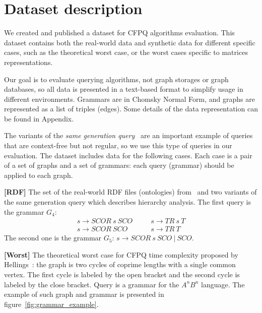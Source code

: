 \section{Dataset description}

We created and published a dataset for CFPQ algorithms evaluation.
This dataset contains both the real-world data and synthetic data for different specific cases, such as the theoretical worst case, or the worst cases specific to matrices representations.

Our goal is to evaluate querying algorithms, not graph storages or graph databases, so all data is presented in a text-based format to simplify usage in different environments.
Grammars are in Chomsky Normal Form, and graphs are represented as a list of triples (edges).
Some details of the data representation can be found in Appendix.

The variants of the \textit{same generation query}~\cite{FndDB} are an important example of queries that are context-free but not regular, so we use this type of queries in our evaluation.
The dataset includes data for the following cases.
Each case is a pair of a set of graphs and a set of grammars: each query (grammar) should be applied to each graph.

\textbf{[RDF]} The set of the real-world RDF files (ontologies) from~\cite{RDF} and two variants of the same generation query which describes hierarchy analysis.
The first query is the grammar $G_4$:
\[
 \begin{array}{lcl}
   s  \rightarrow \textit{SCOR} \ s \ \textit{SCO}   & \quad & s  \rightarrow \textit{TR} \ s \ \textit{T}     \\
   s  \rightarrow \textit{SCOR} \ \textit{SCO}       & \quad & s  \rightarrow  \textit{TR}  \ \textit{T}

 \end{array}
 \]
The second one is the grammar $G_5$: $s \rightarrow \textit{SCOR} \ s \ \textit{SCO} \ | \  \textit{SCO}$.

\textbf{[Worst]} The theoretical worst case for CFPQ time complexity proposed by Hellings~\cite{hellingsPathQuerying}: the graph is two cycles of coprime lengths with a single common vertex.
The first cycle is labeled by the open bracket and the second cycle is labeled by the close bracket.
Query is a grammar for the $A^nB^n$ language.
The example of such graph and grammar is presented in figure~\ref{fig:grammar_example}.

